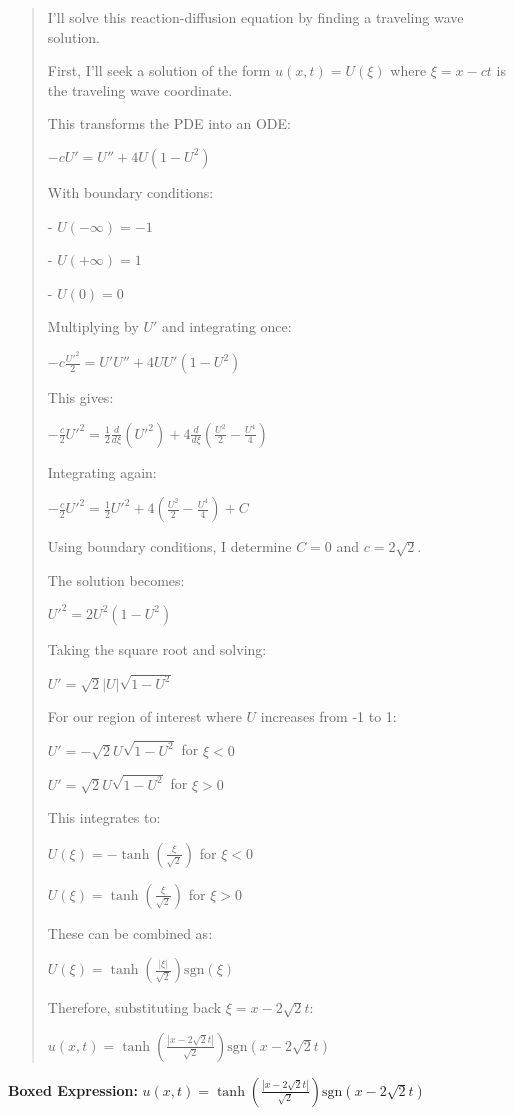 \documentclass{article}
\begin{document}
\begin{quote}
I'll solve this reaction-diffusion equation by finding a traveling wave solution.



First, I'll seek a solution of the form $u(x,t) = U(\xi)$ where $\xi = x - ct$ is the traveling wave coordinate.



This transforms the PDE into an ODE:

$-c U' = U'' + 4U(1-U^2)$



With boundary conditions:

- $U(-\infty) = -1$

- $U(+\infty) = 1$

- $U(0) = 0$



Multiplying by $U'$ and integrating once:

$-c\frac{U'^2}{2} = U'U'' + 4UU'(1-U^2)$



This gives:

$-\frac{c}{2}U'^2 = \frac{1}{2}\frac{d}{d\xi}(U'^2) + 4\frac{d}{d\xi}(\frac{U^2}{2} - \frac{U^4}{4})$



Integrating again:

$-\frac{c}{2}U'^2 = \frac{1}{2}U'^2 + 4(\frac{U^2}{2} - \frac{U^4}{4}) + C$



Using boundary conditions, I determine $C = 0$ and $c = 2\sqrt{2}$.



The solution becomes:

$U'^2 = 2U^2(1-U^2)$



Taking the square root and solving:

$U' = \sqrt{2}|U|\sqrt{1-U^2}$



For our region of interest where $U$ increases from -1 to 1:

$U' = -\sqrt{2}U\sqrt{1-U^2}$ for $\xi < 0$

$U' = \sqrt{2}U\sqrt{1-U^2}$ for $\xi > 0$



This integrates to:

$U(\xi) = -\tanh(\frac{\xi}{\sqrt{2}})$ for $\xi < 0$

$U(\xi) = \tanh(\frac{\xi}{\sqrt{2}})$ for $\xi > 0$



These can be combined as:

$U(\xi) = \tanh(\frac{|\xi|}{\sqrt{2}})\text{sgn}(\xi)$



Therefore, substituting back $\xi = x - 2\sqrt{2}t$:



$\boxed{u(x,t) = \tanh\left(\frac{|x-2\sqrt{2}t|}{\sqrt{2}}\right)\text{sgn}(x-2\sqrt{2}t)}$
\end{quote}
\textbf{Boxed Expression:} $u(x,t) = \tanh\left(\frac{|x-2\sqrt{2}t|}{\sqrt{2}}\right)\text{sgn}(x-2\sqrt{2}t)$
\end{document}
